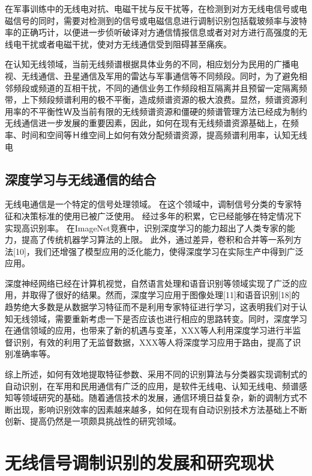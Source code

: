 在军事训练中的无线电对抗、电磁干扰与反干扰等，在检测到对方无线电信号或电磁信号的同时，需要对检测到的信号或电磁信息进行调制识别包括载玻频率与波特率的正确巧计，以便进一步侦听破译对方通信情报信息或者对对方进行高强度的无线电干扰或者电磁干扰，使对方无线通信受到阻碍甚至痛疾。\par

在认知无线领域，当前无线频谱根据具体业务的不同，相应划分为民用的广播电视、无线通信、丑星通信及军用的雷达与军事通信等不同频段。同时，为了避免相邻频段或频道的互相干扰，不同的通信业务工作频段相互隔离并且预留一定隔离频带，上下频段频谱利用的极不平衡，造成频谱资源的极大浪费。显然，频谱资源利用率的不平衡性Ｗ及当前有限的无线频谱资源和僵硬的频谱管理方法已经成为制约无线通信进一步发展的重要因素，因此，如何在现有无线频谱资源基础上，在频率、时间和空间等Ｈ维空间上如何有效分配频谱资源，提高频谱利用率，认知无线电\par

\subsection{深度学习与无线通信的结合}

无线电通信是一个特定的信号处理领域。 在这个领域中，调制信号分类的专家特征和决策标准的使用已被广泛使用。 经过多年的积累，它已经能够在特定情况下实现高识别率。 在ImageNet竞赛中，识别深度学习的能力超出了人类专家的能力，提高了传统机器学习算法的上限。 此外，通过差异，卷积和合并等一系列方法[10]，我们还增强了模型应用的泛化能力，使得深度学习在实际生产中得到广泛应用。\par

深度神经网络已经在计算机视觉，自然语言处理和语音识别等领域实现了广泛的应用，并取得了很好的结果。然而，深度学习应用于图像处理[11]和语音识别[18]的趋势绝大多数是从数据学习特征而不是利用专家特征进行学习，这表明我们对于认知无线领域，需要重新考虑一下是否应该也进行相应的思路转变。同时，深度学习在通信领域的应用，也带来了新的机遇与变革，XXX等人利用深度学习进行半监督识别，有效的利用了无监督数据，XXX等人将深度学习应用于路由，提高了识别准确率等。\par

综上所述，如何有效地提取特征参数、采用不同的识别算法与分类器实现调制式的自动识别，在军用和民用通信有广泛的应用，是软件无线电、认知无线电、频谱感知等领域研究的基础。随着通信技术的发展，通信环境日益复杂，新的调制方式不断出现，影响识别效率的因素越来越多，如何在现有自动识别技术方法基础上不断创新、提高仍然是一项颇具挑战性的研究领域。\par


\section{无线信号调制识别的发展和研究现状}

